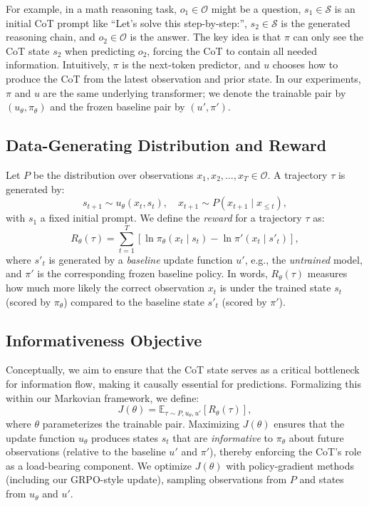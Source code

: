 \documentclass{article} %
\begin{document}
For example, in a math reasoning task, $o_1 \in \mathcal{O}$ might be a question, $s_1 \in \mathcal{S}$ is an initial CoT prompt like ``Let's solve this step-by-step:'', $s_2 \in \mathcal{S}$ is the generated reasoning chain, and $o_2 \in \mathcal{O}$ is the answer. The key idea is that $\pi$ can only see the CoT state $s_2$ when predicting $o_2$, forcing the CoT to contain all needed information. Intuitively, $\pi$ is the next-token predictor, and $u$ chooses how to produce the CoT from the latest observation and prior state. In our experiments, $\pi$ and $u$ are the same underlying transformer; we denote the trainable pair by $(u_\theta,\pi_\theta)$ and the frozen baseline pair by $(u',\pi')$.

\subsection{Data-Generating Distribution and Reward}

Let $P$ be the distribution over observations $x_1, x_2, \dots, x_T \in \mathcal{O}$. A trajectory $\tau$ is generated by:
\[
s_{t+1}\sim u_\theta(x_t, s_t), \quad x_{t+1}\sim P(x_{t+1}\mid x_{\le t}),
\]
with $s_1$ a fixed initial prompt. We define the \emph{reward} for a trajectory $\tau$ as:
\[
R_\theta(\tau)=\sum_{t=1}^T \left[\ln \pi_\theta(x_t\mid s_t)-\ln \pi'(x_t\mid s'_t)\right],
\]
where $s'_t$ is generated by a \emph{baseline} update function $u'$, e.g., the \emph{untrained} model, and $\pi'$ is the corresponding frozen baseline policy. In words, $R_\theta(\tau)$ measures how much more likely the correct observation $x_t$ is under the trained state $s_t$ (scored by $\pi_\theta$) compared to the baseline state $s'_t$ (scored by $\pi'$).

\subsection{Informativeness Objective}

Conceptually, we aim to ensure that the CoT state serves as a critical bottleneck for information flow, making it causally essential for predictions. Formalizing this within our Markovian framework, we define:
\[
  J(\theta)=\mathbb{E}_{\tau \sim P,u_\theta,u'}\left[R_\theta(\tau)\right],
\]
where $\theta$ parameterizes the trainable pair. Maximizing $J(\theta)$ ensures that the update function $u_\theta$ produces states $s_t$ that are \emph{informative} to $\pi_\theta$ about future observations (relative to the baseline $u'$ and $\pi'$), thereby enforcing the CoT's role as a load-bearing component. We optimize $J(\theta)$ with policy-gradient methods (including our GRPO-style update), sampling observations from $P$ and states from $u_\theta$ and $u'$.
\end{document}
